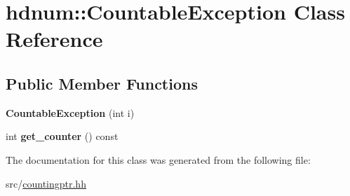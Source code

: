 \hypertarget{classhdnum_1_1CountableException}{
\section{hdnum::CountableException Class Reference}
\label{classhdnum_1_1CountableException}
}
\subsection*{Public Member Functions}
\begin{DoxyCompactItemize}
\item 
\hypertarget{classhdnum_1_1CountableException_aed359e1ef23bda6894f557148665102f}{
{\bfseries CountableException} (int i)}
\label{classhdnum_1_1CountableException_aed359e1ef23bda6894f557148665102f}

\item 
\hypertarget{classhdnum_1_1CountableException_a91e950ea5654bd37cc37dea6b75cbb3c}{
int {\bfseries get\_\-counter} () const }
\label{classhdnum_1_1CountableException_a91e950ea5654bd37cc37dea6b75cbb3c}

\end{DoxyCompactItemize}


The documentation for this class was generated from the following file:\begin{DoxyCompactItemize}
\item 
src/\hyperlink{countingptr_8hh}{countingptr.hh}\end{DoxyCompactItemize}
